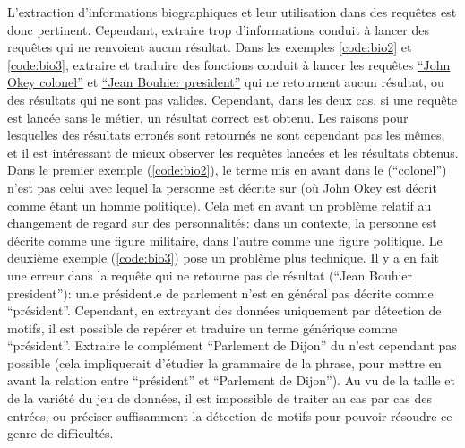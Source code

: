 L'extraction d'informations biographiques et leur utilisation dans des requêtes est donc pertinent. Cependant, extraire trop d'informations conduit à lancer des requêtes qui ne renvoient aucun résultat. Dans les exemples \ref{code:bio2} et \ref{code:bio3}, extraire et traduire des fonctions conduit à lancer les requêtes \href{https://www.wikidata.org/w/index.php?search=John+Okey+colonel&title=Special:Search&profile=advanced&fulltext=1&ns0=1&ns120=1}{\enquote{John Okey colonel}} et \href{https://www.wikidata.org/w/index.php?search=Jean+Bouhier+president&title=Special:Search&profile=advanced&fulltext=1&ns0=1&ns120=1}{\enquote{Jean Bouhier president}} qui ne retournent aucun résultat, ou des résultats qui ne sont pas valides. Cependant, dans les deux cas, si une requête est lancée sans le métier, un résultat correct est obtenu. Les raisons pour lesquelles des résultats erronés sont retournés ne sont cependant pas les mêmes, et il est intéressant de mieux observer les requêtes lancées et les résultats obtenus. Dans le premier exemple (\ref{code:bio2}), le terme mis en avant dans le \ttrait{} (\enquote{colonel}) n'est pas celui avec lequel la personne est décrite sur \wkd{} (où John Okey est décrit comme étant un homme politique). Cela met en avant un problème relatif au changement de regard sur des personnalités: dans un contexte, la personne est décrite comme une figure militaire, dans l'autre comme une figure politique. Le deuxième exemple (\ref{code:bio3}) pose un problème plus technique. Il y a en fait une erreur dans la requête qui ne retourne pas de résultat (\enquote{Jean Bouhier president}): un.e président.e de parlement n'est en général pas décrite comme \enquote{président}. Cependant, en extrayant des données uniquement par détection de motifs, il est possible de repérer et traduire un terme générique comme \enquote{président}. Extraire le complément \enquote{Parlement de Dijon} du \ttrait{} n'est cependant pas possible (cela impliquerait d'étudier la grammaire de la phrase, pour mettre en avant la relation entre \enquote{président} et \enquote{Parlement de Dijon}). Au vu de la taille et de la variété du jeu de données, il est impossible de traiter au cas par cas des entrées, ou préciser suffisamment la détection de motifs pour pouvoir résoudre ce genre de difficultés. 

